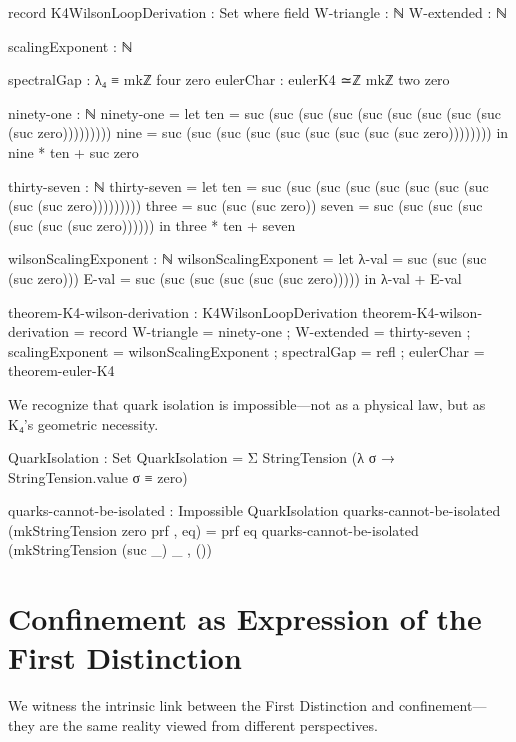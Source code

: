 \documentclass[11pt,a4paper]{book}
\begin{document}
\begin{code}
record K4WilsonLoopDerivation : Set where
  field
    W-triangle : ℕ
    W-extended : ℕ
    
    scalingExponent : ℕ
    
    spectralGap  : λ₄ ≡ mkℤ four zero
    eulerChar    : eulerK4 ≃ℤ mkℤ two zero

ninety-one : ℕ
ninety-one = 
  let ten = suc (suc (suc (suc (suc (suc (suc (suc (suc (suc zero)))))))))
      nine = suc (suc (suc (suc (suc (suc (suc (suc (suc zero))))))))
  in nine * ten + suc zero

thirty-seven : ℕ
thirty-seven = 
  let ten = suc (suc (suc (suc (suc (suc (suc (suc (suc (suc zero)))))))))
      three = suc (suc (suc zero))
      seven = suc (suc (suc (suc (suc (suc (suc zero))))))
  in three * ten + seven

wilsonScalingExponent : ℕ
wilsonScalingExponent = 
  let λ-val = suc (suc (suc (suc zero)))
      E-val = suc (suc (suc (suc (suc (suc zero)))))
  in λ-val + E-val

theorem-K4-wilson-derivation : K4WilsonLoopDerivation
theorem-K4-wilson-derivation = record
  { W-triangle = ninety-one
  ; W-extended = thirty-seven
  ; scalingExponent = wilsonScalingExponent
  ; spectralGap  = refl
  ; eulerChar    = theorem-euler-K4
  }
\end{code}

We recognize that quark isolation is impossible—not as a physical law, but as K₄'s geometric necessity.

\begin{code}
QuarkIsolation : Set
QuarkIsolation = Σ StringTension (λ σ → StringTension.value σ ≡ zero)

quarks-cannot-be-isolated : Impossible QuarkIsolation
quarks-cannot-be-isolated (mkStringTension zero prf , eq) = prf eq
quarks-cannot-be-isolated (mkStringTension (suc _) _ , ())
\end{code}

\section{Confinement as Expression of the First Distinction}

We witness the intrinsic link between the First Distinction and confinement—they are the same reality viewed from different perspectives.
\end{document}
